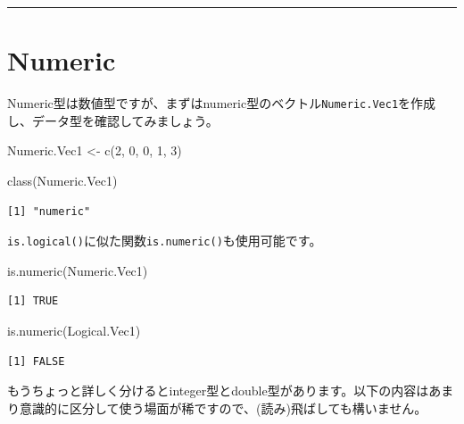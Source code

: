 \documentclass[
  a4paper,
  pandoc,
  ja=standard,
  jafont=haranoaji]{bxjsbook}
\newenvironment{Shaded}{\begin{snugshade}}{\end{snugshade}}
\newcommand{\DecValTok}[1]{\textcolor[rgb]{0.68,0.00,0.00}{#1}}
\newcommand{\FunctionTok}[1]{\textcolor[rgb]{0.28,0.35,0.67}{#1}}
\newcommand{\NormalTok}[1]{\textcolor[rgb]{0.00,0.48,0.65}{#1}}
\newcommand{\OtherTok}[1]{\textcolor[rgb]{0.00,0.48,0.65}{#1}}
\begin{document}
\begin{center}\rule{0.5\linewidth}{0.5pt}\end{center}

\hypertarget{sec-type_numeric}{%
\section{Numeric}\label{sec-type_numeric}}

Numeric型は数値型ですが、まずはnumeric型のベクトル\texttt{Numeric.Vec1}を作成し、データ型を確認してみましょう。

\begin{Shaded}
\begin{Highlighting}[numbers=left,,]
\NormalTok{Numeric.Vec1 }\OtherTok{\textless{}{-}} \FunctionTok{c}\NormalTok{(}\DecValTok{2}\NormalTok{, }\DecValTok{0}\NormalTok{, }\DecValTok{0}\NormalTok{, }\DecValTok{1}\NormalTok{, }\DecValTok{3}\NormalTok{)}

\FunctionTok{class}\NormalTok{(Numeric.Vec1)}
\end{Highlighting}
\end{Shaded}

\begin{verbatim}
[1] "numeric"
\end{verbatim}

\texttt{is.logical()}に似た関数\texttt{is.numeric()}も使用可能です。

\begin{Shaded}
\begin{Highlighting}[numbers=left,,]
\FunctionTok{is.numeric}\NormalTok{(Numeric.Vec1)}
\end{Highlighting}
\end{Shaded}

\begin{verbatim}
[1] TRUE
\end{verbatim}

\begin{Shaded}
\begin{Highlighting}[numbers=left,,]
\FunctionTok{is.numeric}\NormalTok{(Logical.Vec1)}
\end{Highlighting}
\end{Shaded}

\begin{verbatim}
[1] FALSE
\end{verbatim}

もうちょっと詳しく分けるとinteger型とdouble型があります。以下の内容はあまり意識的に区分して使う場面が稀ですので、(読み)飛ばしても構いません。
\end{document}
